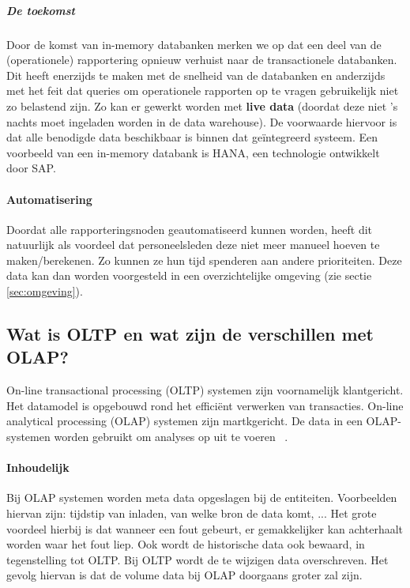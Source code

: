 \subparagraph{De toekomst}
Door de komst van in-memory databanken merken we op dat een deel van de (operationele) rapportering opnieuw verhuist naar de transactionele databanken. Dit heeft enerzijds te maken met de snelheid van de databanken en anderzijds met het feit dat queries om operationele rapporten op te vragen gebruikelijk niet zo belastend zijn. Zo kan er gewerkt worden met \textbf{live data} (doordat deze niet 's nachts moet ingeladen worden in de data warehouse). De voorwaarde hiervoor is dat alle benodigde data beschikbaar is binnen dat geïntegreerd systeem. Een voorbeeld van een in-memory databank is HANA, een technologie ontwikkelt door SAP.

\paragraph{Automatisering}
Doordat alle rapporteringsnoden geautomatiseerd kunnen worden, heeft dit natuurlijk als voordeel dat personeelsleden deze niet meer manueel hoeven te maken/berekenen. Zo kunnen ze hun tijd spenderen aan andere prioriteiten. Deze data kan dan worden voorgesteld in een overzichtelijke omgeving (zie sectie \ref{sec:omgeving}).

\subsection{Wat is OLTP en wat zijn de verschillen met OLAP?}
\label{sec:oltp-vs-olap}
On-line transactional processing (OLTP) systemen zijn voornamelijk klantgericht. Het datamodel is opgebouwd rond het efficiënt verwerken van transacties. On-line analytical processing (OLAP) systemen zijn martkgericht. De data in een OLAP-systemen worden gebruikt om analyses op uit te voeren ~\autocite{Satyanarayana2010}.


\paragraph{Inhoudelijk}
Bij OLAP systemen worden meta data opgeslagen bij de entiteiten. Voorbeelden hiervan zijn: tijdstip van inladen, van welke bron de data komt, ... Het grote voordeel hierbij is dat wanneer een fout gebeurt, er gemakkelijker kan achterhaalt worden waar het fout liep. Ook wordt de historische data ook bewaard, in tegenstelling tot OLTP. Bij OLTP wordt de te wijzigen data overschreven. Het gevolg hiervan is dat de volume data bij OLAP doorgaans groter zal zijn.

